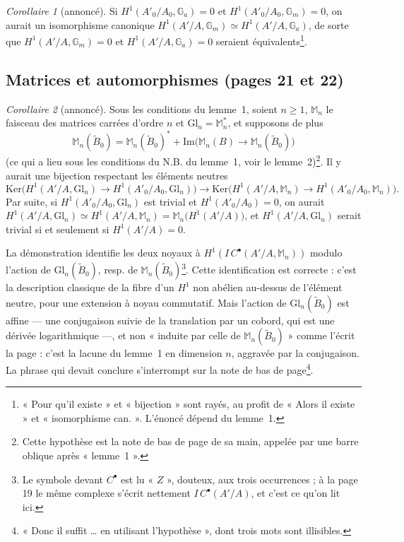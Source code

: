 \documentclass[11pt,a4paper]{article}
\begin{document}
\emph{Corollaire 1} (annoncé). Si $H^1(A'_0/A_0, \mathbb{G}_a) = 0$ et
$H^1(A'_0/A_0, \mathbb{G}_m) = 0$, on aurait un isomorphisme canonique
$H^1(A'/A, \mathbb{G}_m) \simeq H^1(A'/A, \mathbb{G}_a)$, de sorte que
$H^1(A'/A, \mathbb{G}_m) = 0$ et $H^1(A'/A, \mathbb{G}_a) = 0$ seraient
équivalents\footnote{« Pour qu'il existe » et « bijection » sont rayés, au
profit de « Alors il existe » et « isomorphisme can. ». L'énoncé dépend du
lemme~1.}.

\subsection*{Matrices et automorphismes (pages 21 et 22)}

\emph{Corollaire 2} (annoncé). Sous les conditions du lemme~1, soient $n
\geqslant 1$, $\mathbb{M}_n$ le faisceau des matrices carrées d'ordre $n$ et
$\mathrm{Gl}_n = \mathbb{M}_n^{*}$, et supposons de plus
\[
  \mathbb{M}_n(\widetilde{B}_0) = \mathbb{M}_n(\widetilde{B}_0)^{*} +
  \mathrm{Im}\bigl(\mathbb{M}_n(B) \to \mathbb{M}_n(\widetilde{B}_0)\bigr)
\]
(ce qui a lieu sous les conditions du N.B. du lemme~1, voir le
lemme~2)\footnote{Cette hypothèse est la note de bas de page de sa main,
appelée par une barre oblique après « lemme~1 ».}. Il y aurait une bijection
respectant les éléments neutres
\[
  \mathrm{Ker}\bigl(H^1(A'/A, \mathrm{Gl}_n) \to H^1(A'_0/A_0,
  \mathrm{Gl}_n)\bigr) \to \mathrm{Ker}\bigl(H^1(A'/A, \mathbb{M}_n) \to
  H^1(A'_0/A_0, \mathbb{M}_n)\bigr) .
\]
Par suite, si $H^1(A'_0/A_0, \mathrm{Gl}_n)$ est trivial et $H^1(A'_0/A_0)
= 0$, on aurait $H^1(A'/A, \mathrm{Gl}_n) \simeq H^1(A'/A, \mathbb{M}_n) =
\mathbb{M}_n\bigl(H^1(A'/A)\bigr)$, et $H^1(A'/A, \mathrm{Gl}_n)$ serait
trivial si et seulement si $H^1(A'/A) = 0$.

La démonstration identifie les deux noyaux à $H^1(I\,C^{\bullet}(A'/A,
\mathbb{M}_n))$ modulo l'action de $\mathrm{Gl}_n(\widetilde{B}_0)$, resp. de
$\mathbb{M}_n(\widetilde{B}_0)$\footnote{Le symbole devant $C^{\bullet}$ est
lu « $Z$ », douteux, aux trois occurrences ; à la page 19 le même complexe
s'écrit nettement $I\,C^{\bullet}(A'/A)$, et c'est ce qu'on lit ici.}. Cette
identification est correcte : c'est la description classique de la fibre
d'un $H^1$ non abélien au-dessus de l'élément neutre, pour une extension à
noyau commutatif. Mais l'action de $\mathrm{Gl}_n(\widetilde{B}_0)$ est
affine — une conjugaison suivie de la translation par un cobord, qui est
une dérivée logarithmique —, et non « induite par celle de
$\mathbb{M}_n(\widetilde{B}_0)$ » comme l'écrit la page : c'est la lacune du
lemme~1 en dimension $n$, aggravée par la conjugaison. La phrase qui devait
conclure s'interrompt sur la note de bas de page\footnote{« Donc il suffit
… en utilisant l'hypothèse », dont trois mots sont illisibles.}.
\end{document}
